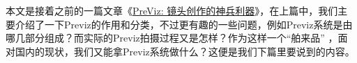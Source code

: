 本文是接着之前的一篇文章《\href{http://www.douban.com/note/207546345/}{PreViz: 镜头创作的神兵利器}》，在上篇中，我们主要介绍了一下Previz的作用和分类，不过更有趣的一些问题，例如Previz系统是由哪几部分组成？而实际的Previz拍摄过程又是怎样？作为这样一个“舶来品” ，面对国内的现状，我们又能拿Previz系统做什么？这便是我们下篇里要说到的内容。
